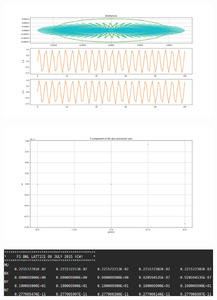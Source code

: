 \documentclass{article}
\begin{document}
\begin{figure}[!h]
  \centering
  \includegraphics[width=\linewidth]{img/effective_gamma_question_three}
  \caption{}
\end{figure}
\begin{figure}[!h]
  \centering
  \includegraphics[width=\linewidth]{img/effective_gamma_question_nx}
  \caption{}
\end{figure}
\begin{figure}[!h]
  \centering
  \includegraphics[width=\linewidth]{img/effective_gamma_question_screen}
  \caption{}
\end{figure}
\end{document}

